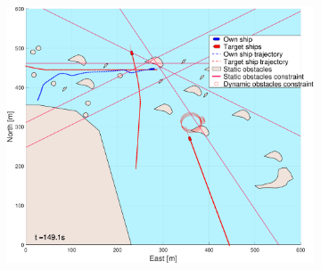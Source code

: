 \begin{figure}[ht]\ContinuedFloat
    \begin{subfigure}[b]{0.494\textwidth}
        \centering
        \includegraphics[width=\textwidth]{Images/NewFigures/skjergard_m_trafikk_NEW/_Simple_0fig1_time=150}
        \subcaption{}
    \end{subfigure}

\end{figure}
